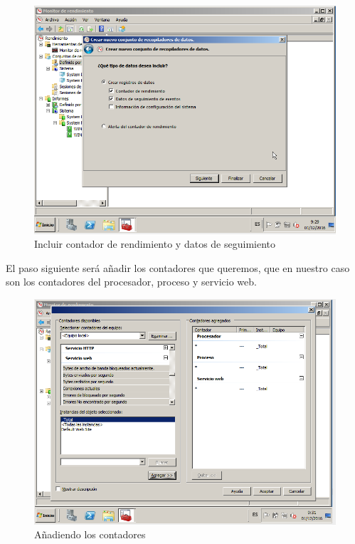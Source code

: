 \begin{figure}[H] %
	\centering
	\includegraphics[scale=0.5]{imagenes/CD-2.png}  %
	\caption{Incluir contador de rendimiento y datos de seguimiento}
\end{figure}

El paso siguiente será añadir los contadores que queremos, que en nuestro caso son los contadores del procesador, proceso y servicio web.

\begin{figure}[H] %
	\centering
	\includegraphics[scale=0.5]{imagenes/CD-3.png}  %
	\caption{Añadiendo los contadores}
\end{figure}

